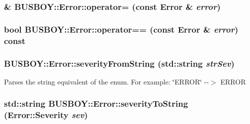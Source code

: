 \label{classBUSBOY_1_1Error_a3e803e02feaf561cab19e946390417a4}
\hypertarget{classBUSBOY_1_1Error_ad7e628677a6f298b976e6842730045d7}{
\subsubsection[{operator=}]{ \& BUSBOY::Error::operator= (const {\bf Error} \& {\em error})}}
\label{classBUSBOY_1_1Error_ad7e628677a6f298b976e6842730045d7}
\hypertarget{classBUSBOY_1_1Error_a7851c34d94750df8fe219b93a9df1c20}{
\subsubsection[{operator==}]{\setlength{\rightskip}{0pt plus 5cm}bool BUSBOY::Error::operator== (const {\bf Error} \& {\em error}) const}}
\label{classBUSBOY_1_1Error_a7851c34d94750df8fe219b93a9df1c20}
\hypertarget{classBUSBOY_1_1Error_ac96052d161b66ee70c5412d1dc4e0d83}{
\subsubsection[{severityFromString}]{ BUSBOY::Error::severityFromString (std::string {\em strSev})}}
\label{classBUSBOY_1_1Error_ac96052d161b66ee70c5412d1dc4e0d83}


Parses the string equivalent of the enum. For example: \char`\"{}ERROR\char`\"{} -\/-\/$>$ ERROR \hypertarget{classBUSBOY_1_1Error_a82fb2633bf6995246b1e5046198da5fa}{
\subsubsection[{severityToString}]{\setlength{\rightskip}{0pt plus 5cm}std::string BUSBOY::Error::severityToString ({\bf Error::Severity} {\em sev})}}
\label{classBUSBOY_1_1Error_a82fb2633bf6995246b1e5046198da5fa}


